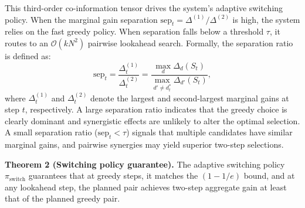 \documentclass[12pt,a4paper,oneside]{report}
\theoremstyle{definition}
\theoremstyle{remark}
\begin{document}
\medskip
\noindent This third-order co-information tensor drives the system's adaptive switching policy. When the marginal gain separation $\text{sep}_t = \Delta^{(1)} / \Delta^{(2)}$ is high, the system relies on the fast greedy policy. When separation falls below a threshold $\tau$, it routes to an $\mathcal{O}(kN^2)$ pairwise lookahead search. Formally, the separation ratio is defined as:
\[
\text{sep}_t = \frac{\Delta^{(1)}_t}{\Delta^{(2)}_t} = \frac{\max_{d} \Delta_d(S_t)}{\max_{d' \neq d^*_t} \Delta_{d'}(S_t)},
\]
where $\Delta^{(1)}_t$ and $\Delta^{(2)}_t$ denote the largest and second-largest marginal gains at step $t$, respectively. A large separation ratio indicates that the greedy choice is clearly dominant and synergistic effects are unlikely to alter the optimal selection. A small separation ratio ($\text{sep}_t < \tau$) signals that multiple candidates have similar marginal gains, and pairwise synergies may yield superior two-step selections.

\medskip
\textbf{Theorem 2 (Switching policy guarantee).} The adaptive switching policy $\pi_{\text{switch}}$ guarantees that at greedy steps, it matches the $(1 - 1/e)$ bound, and at any lookahead step, the planned pair achieves two-step aggregate gain at least that of the planned greedy pair.
\end{document}

